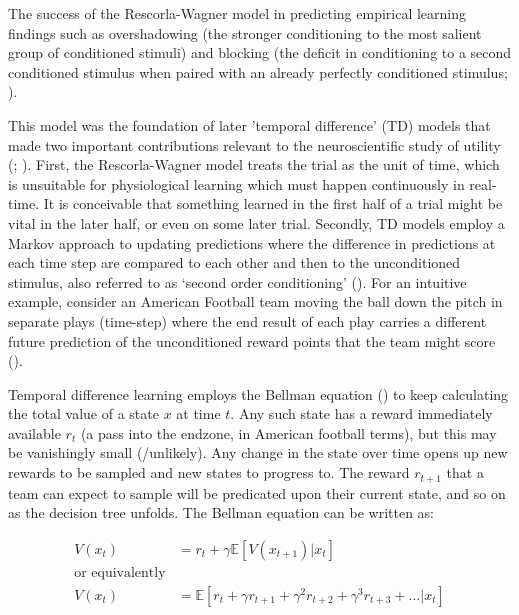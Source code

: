 The success of the Rescorla-Wagner model in predicting empirical learning findings such as overshadowing (the stronger conditioning to the most salient group of conditioned stimuli) and blocking (the deficit in conditioning to a second conditioned stimulus when paired with an already perfectly conditioned stimulus; \cite{millerAssessmentRescorlaWagnerModel1995}).

This model was the foundation of later 'temporal difference' (TD) models that made two important contributions relevant to the neuroscientific study of utility (\cite{ludvigEvaluatingTDModel2012}; \cite{suttonModernTheoryAdaptive1981}). First, the Rescorla-Wagner model treats the trial as the unit of time, which is unsuitable for physiological learning which must happen continuously in real-time. It is conceivable that something learned in the first half of a trial might be vital in the later half, or even on some later trial. Secondly, TD models employ a Markov approach to updating predictions where the difference in predictions at each time step are compared to each other and then to the unconditioned stimulus, also referred to as ‘second order conditioning’ (\cite{suttonTimeDerivativeModelsPavlovian1990}). For an intuitive example, consider an American Football team moving the ball down the pitch in separate plays (time-step) where the end result of each play carries a different future prediction of the unconditioned reward points that the team might score (\cite{dawValueLearningReinforcement2014}).

Temporal difference learning employs the Bellman equation (\cite{bellmanDynamicProgrammingStatistical1957}) to keep calculating the total value of a state $x$ at time $t$. Any such state has a reward immediately available $r_t$ (a pass into the endzone, in American football terms), but this may be vanishingly small (/unlikely). Any change in the state over time opens up new rewards to be sampled and new states to progress to. The reward $r_{t+1}$ that a team can expect to sample will be predicated upon their current state, and so on as the decision tree unfolds. The Bellman equation can be written as:

\begin{equation}
\begin{aligned}
V(x_t) &= r_t + \gamma \mathbb{E}[V(x_{t+1}) | x_t] \\
\text{or equivalently} \\
V(x_t) &= \mathbb{E}[r_t + \gamma r_{t+1} + \gamma^2 r_{t+2} + \gamma^3 r_{t+3} + \ldots | x_t]
\end{aligned}
\label{eq:bellman}
\end{equation}

